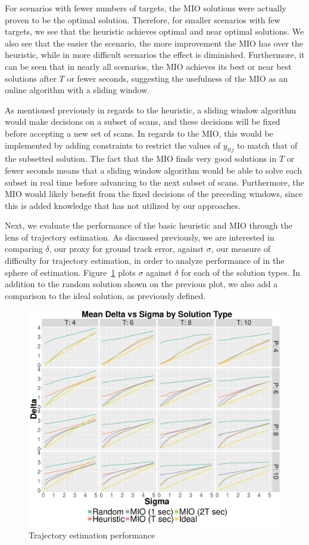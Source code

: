 For scenarios with fewer numbers of targets, the MIO solutions were actually proven to be the optimal solution. Therefore, for smaller scenarios with few targets, we see that the heuristic achieves optimal and near optimal solutions. We also see that the easier the scenario, the more improvement the MIO has over the heuristic, while in more difficult scenarios the effect is diminished. Furthermore, it can be seen that in nearly all scenarios, the MIO achieves its best or near best solutions after $T$ or fewer seconds, suggesting the usefulness of the MIO as an online algorithm with a sliding window. 

As mentioned previously in regards to the heuristic, a sliding window algorithm would make decisions on a subset of scans, and these decisions will be fixed before accepting a new set of scans. In regards to the MIO, this would be implemented by adding constraints to restrict the values of $y_{itj}$ to match that of the subsetted solution. The fact that the MIO finds very good solutions in $T$ or fewer seconds means that a sliding window algorithm would be able to solve each subset in real time before advancing to the next subset of scans. Furthermore, the MIO would likely benefit from the fixed decisions of the preceding windows, since this is added knowledge that has not utilized by our approaches.

Next, we evaluate the performance of the basic heuristic and MIO through the lens of trajectory estimation. As discussed previously, we are interested in comparing $\delta$, our proxy for ground track error, against $\sigma$, our measure of difficulty for trajectory estimation, in order to analyze performance of in the sphere of estimation. Figure~\ref{Fig:Basic_Delta_Summary} plots $\sigma$ against $\delta$ for each of the solution types. In addition to the random solution shown on the previous plot, we also add a comparison to the ideal solution, as previously defined.
\begin{figure}[ht]
  \centering
  \includegraphics[width=\columnwidth]{../Figures/Basic_Delta_Summary}
  \caption{Trajectory estimation performance}
  \label{Fig:Basic_Delta_Summary}
\end{figure}

